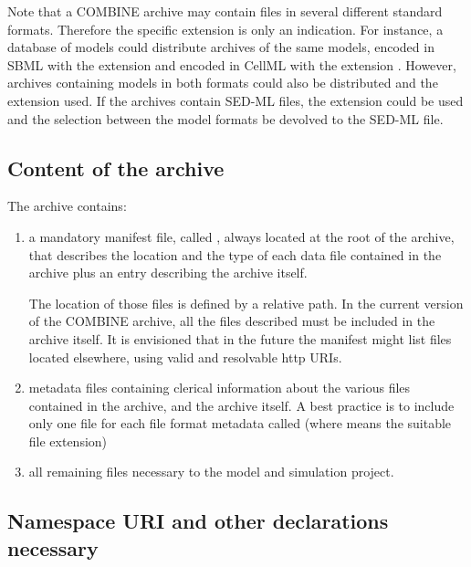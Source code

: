 Note that a COMBINE archive may contain files in several different standard formats. Therefore the specific extension is only an indication. For instance, a database of models could distribute archives of the same models, encoded in SBML with the extension  and encoded in CellML with the extension . However, archives containing models in both formats could also be distributed and the extension  used. If the archives contain SED-ML files, the extension  could be used and the selection between the model formats be devolved to the SED-ML file. 

\subsection{Content of the archive}

The archive contains: 

\begin{enumerate}
	\item {
	
     a mandatory manifest file, called , always located at the 
     root of the archive, that describes the location and the type of each 
     data file contained in the archive plus an entry describing 
     the archive itself.
     
     The location of those files is defined by a relative path. In the current 
     version of the COMBINE archive, all the files described must be included 
     in the archive itself. It is envisioned that in the future the manifest 
     might list files located elsewhere, using valid and resolvable http 
     URIs. 

	}
	\item {
     metadata files containing clerical information about the 
     various files contained in the archive, and the archive itself. A best practice is to include only one file for each file format metadata called  (where \token{*} means the 
     suitable file extension)
	}
	\item {all remaining files necessary to the model and simulation project. }

\end{enumerate}

\subsection{Namespace URI and other declarations necessary}
\label{xml-namespace}

